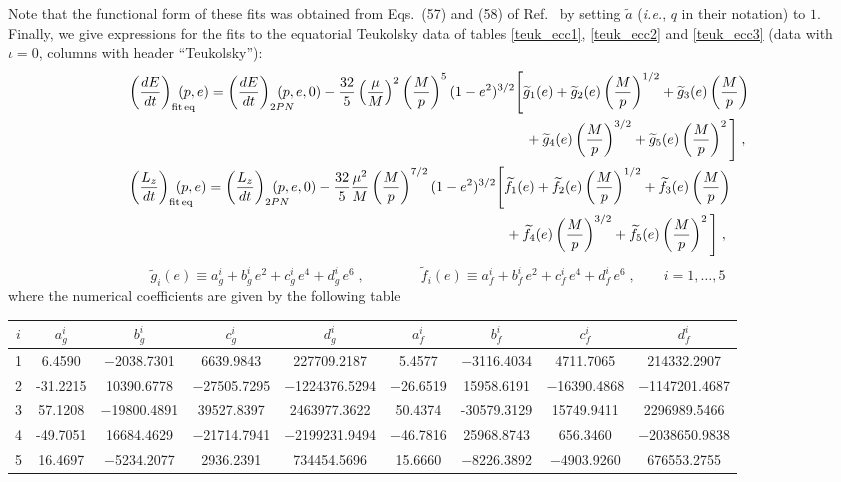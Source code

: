 \documentclass[aps,prd,twocolumn,showpacs,groupedaddress,nofootinbib]{revtex4}
\newcommand\T{\rule{0pt}{3ex}}
\newcommand\B{\rule[-2ex]{0pt}{0pt}}
\begin{document}
\begin{widetext}
Note that the functional form of these fits was obtained from
Eqs.\ (57) and (58) of Ref.~\cite{GG_kludge_fluxes} by setting
$\tilde{a}$ (\textit{i.e.}, $q$ in their notation) to $1$. Finally, we
give expressions for the fits to the equatorial Teukolsky data of
tables \ref{teuk_ecc1}, \ref{teuk_ecc2} and \ref{teuk_ecc3} (data with
$\iota=0$, columns with header ``Teukolsky''):
\begin{align}
&\left(\frac{dE}{dt}\right)_{\rm fit\, eq}\hskip-0.5cm(p,e)=
  \left(\frac{dE}{dt}\right)_{2PN}\hskip-0.5cm(p,e,0)-\frac{32}{5}\left(\frac{\mu}{M}\right)^2\left(\frac{M}{p}\right)^5
  (1-e^2)^{3/2}\Bigg[\widetilde{g}_1(e)+\widetilde{g}_2(e)\left(\frac{M}{p}\right)^{1/2}
    +\widetilde{g}_3(e)\left(\frac{M}{p}\right)\nonumber\\&
    \hskip10.cm+\widetilde{g}_4(e)\left(\frac{M}{p}\right)^{3/2}+
    \widetilde{g}_5(e)\left(\frac{M}{p}\right)^2\Bigg]\;,\label{EdotFitEq}
  \\ & \left(\frac{L_z}{dt}\right)_{\rm fit\,
    eq}\hskip-0.5cm(p,e)=\left(\frac{L_z}{dt}\right)_{2PN}\hskip-0.5cm(p,e,0)
  -\frac{32}{5}\frac{\mu^2}{M}\left(\frac{M}{p}\right)^{7/2}
  (1-e^2)^{3/2}\Bigg[\widetilde{f}_1(e)+\widetilde{f}_2(e)\left(\frac{M}{p}\right)^{1/2}+\widetilde{f}_3(e)\left(\frac{M}{p}\right)
    \nonumber\\&
    \hskip9.5cm+\widetilde{f}_4(e)\left(\frac{M}{p}\right)^{3/2}+
    \widetilde{f}_5(e)\left(\frac{M}{p}\right)^2\Bigg]\;,\label{LdotFitEq}
\end{align}
\begin{equation}
\widetilde{g}_i(e) \equiv a_g^i+b_g^i\,e^2+c_g^i\,e^4+d_g^i\,e^6\;, \qquad \qquad 
\widetilde{f}_i(e) \equiv a_f^i+b_f^i\,e^2+c_f^i\,e^4+d_f^i\,e^6\;, \quad \quad  i=1,\ldots,5
\end{equation}
where the numerical coefficients are given by the following table
\begin{table}[h]
\begin{tabular}{|c|c|c|c|c|c|c|c|c|}
\hline
\T \B$i$ & $a_g^i$ & $b_g^i$ & $c_g^i$ & $d_g^i$ & $a_f^i$ & $b_f^i$ & $c_f^i$& $d_f^i$ \\
\hline
\T \B 1  & 6.4590 & $-$2038.7301 & 6639.9843 & 227709.2187 & 5.4577&  $-$3116.4034& 4711.7065 & 214332.2907\\
\T \B 2 &-31.2215 & 10390.6778& $-$27505.7295& $-$1224376.5294 &    $-$26.6519 & 15958.6191 & $-$16390.4868 & $-$1147201.4687\\
\T \B 3 &57.1208& $-$19800.4891& 39527.8397& 2463977.3622 &    50.4374 &-30579.3129& 15749.9411 & 2296989.5466\\
\T \B 4 &-49.7051& 16684.4629& $-$21714.7941& $-$2199231.9494 &     $-$46.7816 & 25968.8743 & 656.3460 & $-$2038650.9838\\
\T \B 5 &16.4697& $-$5234.2077& 2936.2391&  734454.5696 &    15.6660 & $-$8226.3892 & $-$4903.9260 & 676553.2755\\
\hline
\end{tabular}
\end{table}


\end{widetext}
\end{document}
